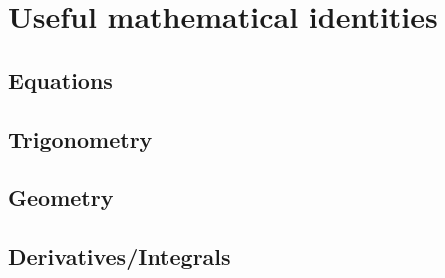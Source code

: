 
\chapter{Useful mathematical identities}

\section{Equations}

\section{Trigonometry}

\section{Geometry}

\section{Derivatives/Integrals}

